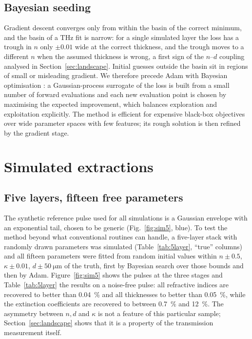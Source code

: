 \documentclass{optica-article}
\newcommand{\kap}{\kappa}
\begin{document}
\subsection{Bayesian seeding}
Gradient descent converges only from within the basin of the correct minimum, and the basin of a THz fit is narrow: for a single simulated layer the loss has a trough in $n$ only $\pm0.01$ wide at the correct thickness, and the trough moves to a different $n$ when the assumed thickness is wrong, a first sign of the $n$--$d$ coupling analysed in Section~\ref{sec:landscape}. Initial guesses outside the basin sit in regions of small or misleading gradient. We therefore precede Adam with Bayesian optimisation \cite{Mockus1978,Rasmussen2006,Srinivas2010,Snoek2012,Shahriari2016,Frazier2018}: a Gaussian-process surrogate of the loss is built from a small number of forward evaluations and each new evaluation point is chosen by maximising the expected improvement, which balances exploration and exploitation explicitly. The method is efficient for expensive black-box objectives over wide parameter spaces with few features; its rough solution is then refined by the gradient stage.

\section{Simulated extractions}\label{sec:sim}
\subsection{Five layers, fifteen free parameters}
The synthetic reference pulse used for all simulations is a Gaussian envelope with an exponential tail, chosen to be generic (Fig.~\ref{fig:sim5}, blue). To test the method beyond what conventional routines can handle, a five-layer stack with randomly drawn parameters was simulated (Table~\ref{tab:5layer}, ``true'' columns) and all fifteen parameters were fitted from random initial values within $n\pm0.5$, $\kap\pm0.01$, $d\pm\SI{50}{\micro\metre}$ of the truth, first by Bayesian search over those bounds and then by Adam. Figure~\ref{fig:sim5} shows the pulses at the three stages and Table~\ref{tab:5layer} the results on a noise-free pulse: all refractive indices are recovered to better than \SI{0.04}{\percent} and all thicknesses to better than \SI{0.05}{\percent}, while the extinction coefficients are recovered to between \SI{0.7}{\percent} and \SI{12}{\percent}. The asymmetry between $n,d$ and $\kap$ is not a feature of this particular sample; Section~\ref{sec:landscape} shows that it is a property of the transmission measurement itself.
\end{document}

